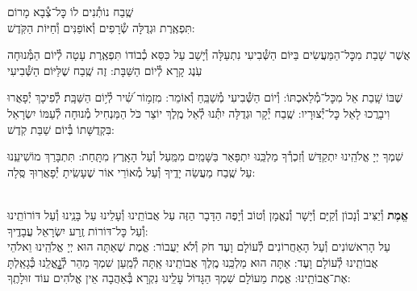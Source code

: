 \documentclass[twoside, openany, parskip=half, 11pt]{book}
\begin{document}
\shatz שֶֽׁבַח נוֹתְ֯נִים לוֹ כׇּל־צְ֯בָא מָרוֹם \\
תִּפְאֶֽרֶת וּגְדֻלָּה שְׂ֯רָפִים וְ֯אוֹפַנִּים וְ֯חַיּוֹת הַקֹּֽדֶשׁ:

\chazzan {}
אֲשֶׁר שָׁבַת מִכׇּל־הַמַּעֲשִׂים בַּיּוֹם הַשְּׁ֯בִיעִי נִתְעַלָּה וְ֯יָשַׁב עַל כִּסֵּא כְ֯בוֹדוֹ תִּפְאֶֽרֶת עָטָה לְ֯יוֹם הַמְּ֯נוּחָה עֹֽנֶג קָרָא לְ֯יוֹם הַשַּׁבָּת: זֶה שֶֽׁבַח שֶׁלַּיּוֹם הַשְּׁ֯בִיעִי

\kahal
שֶׁבּוֹ שָֽׁבַת אֵל מִכׇּל־מְ֯לַאכְתּוֹ: וְ֯יוֹם הַשְּׁ֯בִיעִי מְ֯שַׁבֵּֽחַ וְ֯אוֹמֵר:
%
מִזְמ֥וֹר שִׁ֝֗יר לְ֯י֥וֹם הַשַּׁבָּֽת׃ לְ֯פִיכָךְ יְ֯פָאֲרוּ וִיבָרֲכוּ לָאֵל כׇּל־יְ֯צוּרָיו: שֶֽׁבַח יְ֯קָר וּגְדֻלָּה יִתְּ֯נוּ לְ֯אֵל מֶֽלֶךְ יוֹצֵר כֹּל הַמַּנְחִיל מְ֯נוּחָה לְ֯עַמּוֹ יִשְׂרָאֵל בִּקְדֻשָּׁתוֹ בְּ֯יוֹם שַׁבַּת קֹֽדֶשׁ:

\chazzan
שִׁמְךָ יְיָ אֱלֹהֵֽינוּ יִתְקַדַּשׁ וְ֯זִכְרְ֯ךָ מַלְכֵּֽנוּ יִתְפָּאַר בַּשָּׁמַֽיִם מִמַּֽעַל וְ֯עַל הָאָֽרֶץ מִתָּֽחַת:
תִּתְבָּרַךְ מוֹשִׁיעֵֽנוּ עַל שֶֽׁבַח מַעֲשֵׂה יָדֶֽיךָ וְ֯עַל מְ֯אוֹרֵי אוֹר שֶׁעָשִֽׂיתָ יְ֯פָאֲרֽוּךָ סֶּֽלָה:


\label{tisbarach}
\yotzerhameoros

\ahavaraba

\shema

\veahavta

\vehaya

\vayomer{}

 \smallskip

\begin{paracol}{2}
\\
\textbf{
אֱמֶת
}
וְ֯יַצִּיב וְ֯נָכוֹן וְ֯קַיָּם וְ֯יָשָׁר וְ֯נֶאֱמָן וְ֯טוֹב וְ֯יָפֶה הַדָּבָר הַזֶּה עַל אֲבוֹתֵֽינוּ וְ֯עָלֵינוּ עַל בָּנֵֽינוּ וְ֯עַל דּוֹרוֹתֵֽינוּ וְ֯עַל כׇּל־דּוֹרוֹת זֶֽרַע יִשְׂרָאֵל עֲבָדֶֽיךָ:\\
עַל הָרִאשׁוֹנִים וְ֯עַל הָאַחֲרוֹנִים לְ֯עוֹלָם וָעֶד חֹק וְ֯לֹא יַעֲבוֹר: אֱמֶת שֶׁאַתָּה הוּא יְיָ אֱלֹהֵֽינוּ וֵאלֹהֵי אֲבוֹתֵֽינוּ לְ֯עוֹלָם וָעֶד: אַתָּה הוּא מַלְכֵּֽנוּ מֶֽלֶךְ אֲבוֹתֵֽינוּ אַֽתָּה לְ֯מַֽעַן שִׁמְךָ מַהֵר לְ֯גׇׇׇׇׇׇאֳלֵֽנוּ כְּ֯גָאַֽלְתָּ אֶת־אֲבוֹתֵֽינוּ: אֱמֶת מֵעוֹלָם שִׁמְךָ הַגָּדוֹל עָלֵֽינוּ נִקְרָא בְּ֯אַהֲבָה אֵין אֱלֹהִים עוֹד זוּלָתֶֽךָ:

\switchcolumn

\emesveyatziv

\end{paracol}

\ezrasavoseinu

\clearpage

\gaalyisroel
\end{document}
